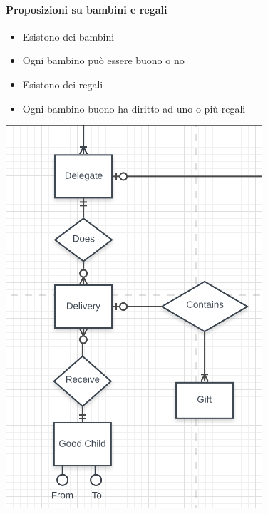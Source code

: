 \documentclass[12pt]{report}
\begin{document}
\paragraph{Proposizioni su bambini e regali}
\begin{itemize}
  \item Esistono dei bambini
  \item Ogni bambino può essere buono o no
  \item Esistono dei regali
  \item Ogni bambino buono ha diritto ad uno o più regali
\end{itemize}
\begin{center}
\includegraphics[scale=0.60]{er3.png}
\end{center}
\end{document}
